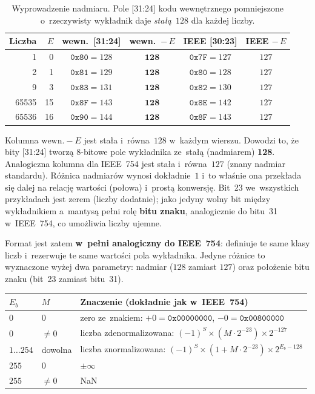 \documentclass[12pt,a4paper]{article}
\begin{document}
\begin{table}[H]
\centering
\small
\begin{tabular}{rrccc c}
\toprule
\textbf{Liczba} & $E$ & wewn.\ [31:24] & \textbf{wewn.\ $-\,E$} & IEEE [30:23] & IEEE $-\,E$ \\
\midrule
1     & 0  & $\texttt{0x80}=128$ & $\mathbf{128}$ & $\texttt{0x7F}=127$ & $127$ \\
2     & 1  & $\texttt{0x81}=129$ & $\mathbf{128}$ & $\texttt{0x80}=128$ & $127$ \\
9     & 3  & $\texttt{0x83}=131$ & $\mathbf{128}$ & $\texttt{0x82}=130$ & $127$ \\
65535 & 15 & $\texttt{0x8F}=143$ & $\mathbf{128}$ & $\texttt{0x8E}=142$ & $127$ \\
65536 & 16 & $\texttt{0x90}=144$ & $\mathbf{128}$ & $\texttt{0x8F}=143$ & $127$ \\
\bottomrule
\end{tabular}
\caption{Wyprowadzenie nadmiaru. Pole [31:24] kodu wewnętrznego pomniejszone
         o~rzeczywisty wykładnik daje \emph{stałą}~$128$ dla każdej liczby.}
\end{table}

Kolumna $\text{wewn.}-E$ jest stała i~równa~$128$ w~każdym wierszu. Dowodzi to,
że bity [31:24] tworzą 8-bitowe pole wykładnika ze~stałą (nadmiarem)
\textbf{128}. Analogiczna kolumna dla IEEE~754 jest stała i~równa~$127$
(znany nadmiar standardu). Różnica nadmiarów wynosi dokładnie~$1$ i~to właśnie
ona przekłada się dalej na relację wartości (połowa) i~prostą konwersję.
Bit~23 we~wszystkich przykładach jest zerem (liczby dodatnie); jako jedyny
wolny bit między wykładnikiem a~mantysą pełni rolę \textbf{bitu znaku},
analogicznie do bitu~31 w~IEEE~754, co umożliwia liczby ujemne.

\medskip
Format jest zatem \textbf{w~pełni analogiczny do IEEE~754}: definiuje te same
klasy liczb i~rezerwuje te same wartości pola wykładnika. Jedyne różnice to
wyznaczone wyżej dwa parametry: nadmiar ($128$ zamiast $127$) oraz położenie
bitu znaku (bit~23 zamiast bitu~31).

\begin{center}
\begin{tabular}{lll}
\toprule
$E_b$ & $M$ & Znaczenie (dokładnie jak w~IEEE~754) \\
\midrule
$0$        & $0$       & zero ze~znakiem: $+0 = \texttt{0x00000000}$, $-0 = \texttt{0x00800000}$ \\
$0$        & $\neq 0$  & liczba zdenormalizowana: $(-1)^S \times (M\cdot2^{-23}) \times 2^{-127}$ \\
$1\ldots254$ & dowolna & liczba znormalizowana: $(-1)^S \times (1 + M\cdot2^{-23}) \times 2^{E_b-128}$ \\
$255$      & $0$       & $\pm\infty$ \\
$255$      & $\neq 0$  & NaN \\
\bottomrule
\end{tabular}
\end{center}
\end{document}
